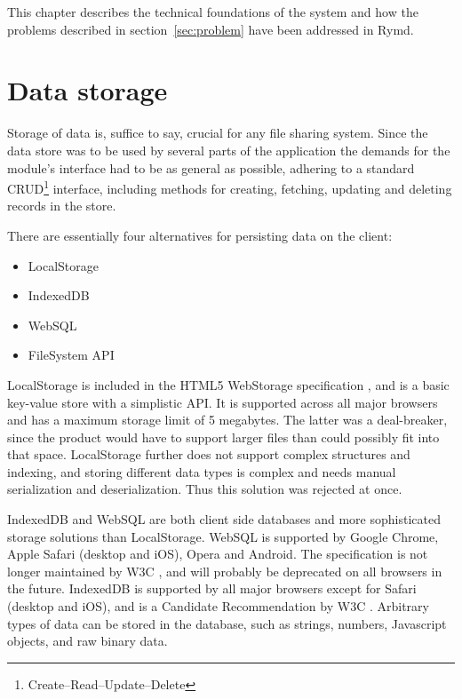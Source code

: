 This chapter describes the technical foundations of the system and how the problems described in section~\ref{sec:problem} have been addressed in Rymd.



\section{Data storage}

Storage of data is, suffice to say, crucial for any file sharing system. Since the data store was to be used by several parts of the application the demands for the module's interface had to be as general as possible, adhering to a standard CRUD\footnote{Create–Read–Update–Delete} interface, including methods for creating, fetching, updating and deleting records in the store.

There are essentially four alternatives for persisting data on the client:

\begin{itemize}
\item LocalStorage
\item IndexedDB
\item WebSQL
\item FileSystem API
\end{itemize}

LocalStorage is included in the HTML5 WebStorage specification \cite{WebStorage:Online}, and is a basic key-value store with a simplistic API. It is supported across all major browsers and has a maximum storage limit of 5 megabytes. The latter was a deal-breaker, since the product would have to support larger files than could possibly fit into that space. LocalStorage further does not support complex structures and indexing, and storing different data types is complex and needs manual serialization and deserialization. Thus this solution was rejected at once.

IndexedDB and WebSQL are both client side databases and more sophisticated storage solutions than LocalStorage. WebSQL is supported by Google Chrome, Apple Safari (desktop and iOS), Opera and Android. The specification is not longer maintained by W3C \cite{WebSQL:Online}, and will probably be deprecated on all browsers in the future. IndexedDB is supported by all major browsers except for Safari (desktop and iOS), and is a Candidate Recommendation by W3C \cite{IndexedDB:Online}. Arbitrary types of data can be stored in the database, such as strings, numbers, Javascript objects, and raw binary data.

